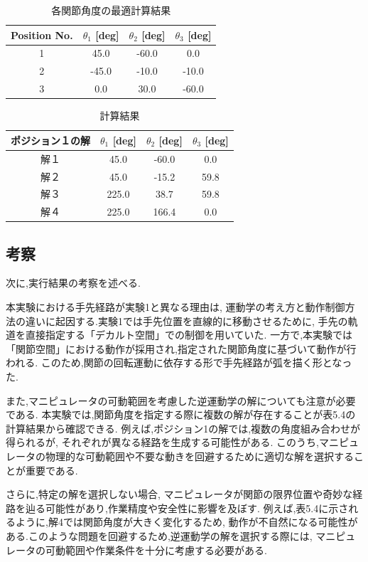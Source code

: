 \begin{table}[h]
  \centering
  \caption{各関節角度の最適計算結果}
  \begin{tabular}{|c|c|c|c|}
    \hline
    Position No. & $\theta_1$ [deg] & $\theta_2$ [deg] & $\theta_3$ [deg] \\ \hline
    \hline
    1            & 45.0             & -60.0            & 0.0              \\ \hline
    2            & -45.0            & -10.0            & -10.0            \\ \hline
    3            & 0.0              & 30.0             & -60.0            \\ \hline
  \end{tabular}
\end{table}

\begin{table}[h]
  \centering
  \caption{計算結果}
  \begin{tabular}{|c|c|c|c|}
    \hline
    ポジション１の解 & $\theta_1$ [deg] & $\theta_2$ [deg] & $\theta_3$ [deg] \\ \hline
    \hline
    解１             & 45.0             & -60.0            & 0.0              \\ \hline
    解２             & 45.0             & -15.2            & 59.8             \\ \hline
    解３             & 225.0            & 38.7             & 59.8             \\ \hline
    解４             & 225.0            & 166.4            & 0.0              \\ \hline
  \end{tabular}
\end{table}

\subsection{考察}
次に,実行結果の考察を述べる.

本実験における手先経路が実験1と異なる理由は,
運動学の考え方と動作制御方法の違いに起因する.実験1では手先位置を直線的に移動させるために,
手先の軌道を直接指定する「デカルト空間」での制御を用いていた.
一方で,本実験では「関節空間」における動作が採用され,指定された関節角度に基づいて動作が行われる.
このため,関節の回転運動に依存する形で手先経路が弧を描く形となった.

また,マニピュレータの可動範囲を考慮した逆運動学の解についても注意が必要である.
本実験では,関節角度を指定する際に複数の解が存在することが表5.4の計算結果から確認できる.
例えば,ポジション1の解では,複数の角度組み合わせが得られるが,
それぞれが異なる経路を生成する可能性がある.
このうち,マニピュレータの物理的な可動範囲や不要な動きを回避するために適切な解を選択することが重要である.

さらに,特定の解を選択しない場合,
マニピュレータが関節の限界位置や奇妙な経路を辿る可能性があり,作業精度や安全性に影響を及ぼす.
例えば,表5.4に示されるように,解4では関節角度が大きく変化するため,
動作が不自然になる可能性がある.このような問題を回避するため,逆運動学の解を選択する際には,
マニピュレータの可動範囲や作業条件を十分に考慮する必要がある.


